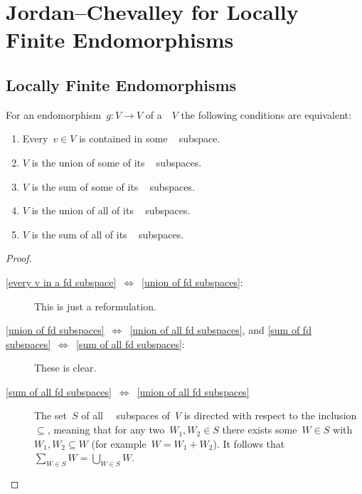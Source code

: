 \section{Jordan--Chevalley for Locally Finite Endomorphisms}





\subsection{Locally Finite Endomorphisms}


\begin{lemma}
  \label{characterization of locally finite endomorphisms}
  For an endomorphism~$g \colon V \to V$ of a~~$V$ the following conditions are equivalent:
  \begin{enumerate}
    \item
      \label{every v in a fd subspace}
      Every~$v \in V$ is contained in some ~ subspace.
    \item
      \label{union of fd subspaces}
      $V$ is the union of some of its ~ subspaces.
    \item
      \label{sum of fd subspaces}
      $V$ is the sum of some of its ~ subspaces.
    \item
      \label{union of all fd subspaces}
      $V$ is the union of all of its ~ subspaces.
    \item
      \label{sum of all fd subspaces}
      $V$ is the sum of all of its ~ subspaces.
  \end{enumerate}
\end{lemma}


\begin{proof}
  \leavevmode
  \begin{description}
    \item[\ref*{every v in a fd subspace}~$\iff$~\ref*{union of fd subspaces}:]
      This is just a reformulation.
    \item[\ref*{union of fd subspaces}~$\iff$~\ref*{union of all fd subspaces}, and \ref*{sum of fd subspaces}~$\iff$~\ref*{sum of all fd subspaces}:]
      These is clear.
    \item[\ref*{sum of all fd subspaces}~$\iff$~\ref*{union of all fd subspaces}]
      The set~$S$ of all~~ subspaces of~$V$ is directed with respect to the inclusion~$\subseteq$, meaning that for any two~$W_1, W_2 \in S$ there exists some~$W \in S$ with~$W_1, W_2 \subseteq W$ (for example~$W = W_1 + W_2$).
      It follows that~$\sum_{W \in S} W = \bigcup_{W \in S} W$.
    \qedhere
  \end{description}
\end{proof}


